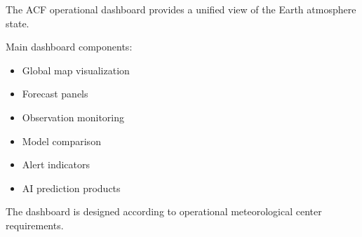 The ACF operational dashboard provides a unified view of the
Earth atmosphere state.


Main dashboard components:


\begin{itemize}

\item Global map visualization

\item Forecast panels

\item Observation monitoring

\item Model comparison

\item Alert indicators

\item AI prediction products

\end{itemize}


The dashboard is designed according to operational meteorological
center requirements.
